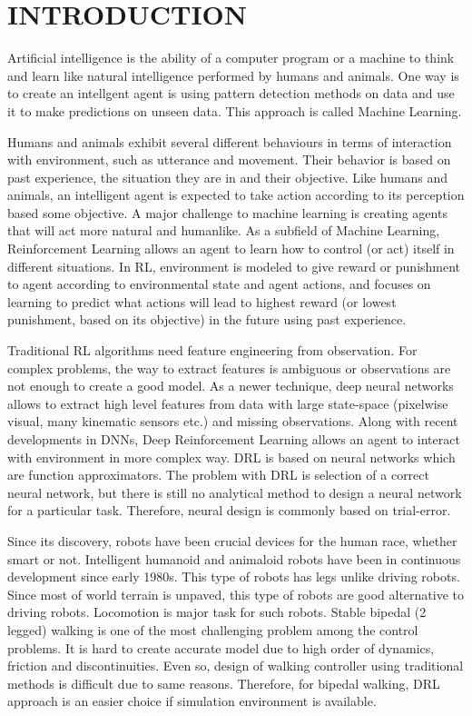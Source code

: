 \chapter{INTRODUCTION}
\label{chap:intro}

Artificial intelligence is the ability of a computer program 
or a machine to think and learn like natural intelligence 
performed by humans and animals. 
One way is to create an intellgent agent is using pattern detection  methods on data and use it to make predictions on unseen data. 
This approach is called Machine Learning. 

Humans and animals exhibit several different behaviours in terms of 
interaction with environment, such as utterance and movement. 
Their behavior is based on past experience, the situation they are in  and their objective. 
Like humans and animals, an intelligent agent is expected to take 
action according to its perception based some objective. 
A major challenge to machine learning is creating agents that will 
act more natural and humanlike. 
As a subfield of Machine Learning, Reinforcement Learning allows an 
agent to learn how to control (or act) itself in different situations. 
In RL, environment is modeled to give reward or punishment to agent 
according to environmental state and agent actions, and focuses on 
learning to predict what actions will lead to highest reward (or 
lowest punishment, based on its objective) in the future using past  experience. 

Traditional RL algorithms need feature engineering from observation. 
For complex problems, the way to extract features is ambiguous or 
observations are not enough to create a good model. 
As a newer  technique, deep neural networks allows to extract 
high level features from data with large state-space 
(pixelwise visual, many kinematic sensors etc.) and missing  observations. 
Along with recent developments in DNNs, Deep Reinforcement Learning 
allows an agent to interact with environment in more complex way. 
DRL is based on neural networks which are function approximators. 
The problem with DRL is selection of a correct neural network, 
but there is still no analytical method to design a neural network for a particular task. 
Therefore, neural design is commonly based on trial-error. 

Since its discovery, robots have been crucial devices for the human race, whether smart or not. 
Intelligent humanoid and animaloid robots have been in 
continuous development since early 1980s. 
This type of robots has legs unlike driving robots. 
Since most of world terrain is unpaved, this type of robots are good alternative to driving robots. 
Locomotion is major task for such robots. Stable bipedal (2 legged)  walking 
is one of the most challenging problem among the control problems. 
It is hard to create accurate model due to high order of dynamics, 
friction and discontinuities. 
Even so, design of walking controller using traditional methods is difficult due to same reasons. 
Therefore, for bipedal walking, DRL approach is an easier choice if simulation environment is available. 

